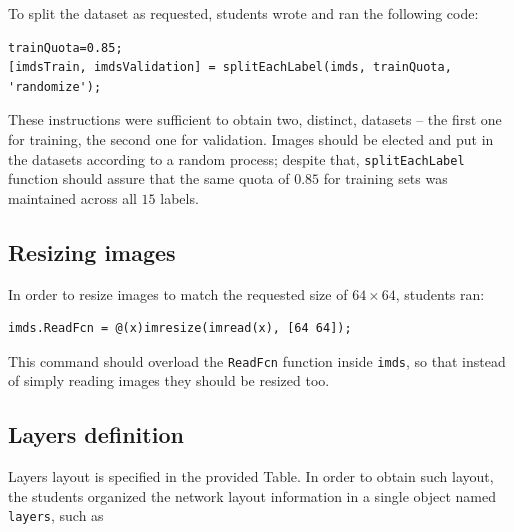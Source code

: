 \documentclass[a4paper, 11pt]{article} %
\begin{document}
To split the dataset as requested, students wrote and ran the following code:

\begin{lstlisting}
trainQuota=0.85;
[imdsTrain, imdsValidation] = splitEachLabel(imds, trainQuota, 'randomize');
\end{lstlisting}

These instructions were sufficient to obtain two, distinct, datasets \--- the first one for training, the second one for validation. Images should be elected and put in the datasets according to a random process; despite that, \texttt{splitEachLabel} function should assure that the same quota of $0.85$ for training sets was maintained across all $15$ labels.

\subsection{Resizing images}

In order to resize images to match the requested size of $64 \times 64$, students ran:

\begin{lstlisting} 
imds.ReadFcn = @(x)imresize(imread(x), [64 64]);
\end{lstlisting}

This command should overload the \texttt{ReadFcn} function inside \texttt{imds}, so that instead of simply reading images they should be resized too.

\subsection{Layers definition}

Layers layout is specified in the provided Table. In order to obtain such layout, the students organized the network layout information in a single object named \texttt{layers}, such as
\end{document}
